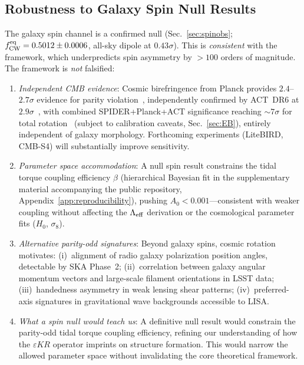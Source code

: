 \documentclass[aps,prd,twocolumn,superscriptaddress,showpacs,preprintnumbers,nofootinbib,longbibliography,floatfix]{revtex4-2}
\newcommand{\Leff}{\Lambda_{\rm eff}}
\newcommand{\fcw}{f_{\rm CW}}
\begin{document}
\subsection{Robustness to Galaxy Spin Null Results}\label{sec:spinnull}

The galaxy spin channel is a confirmed null (Sec.~\ref{sec:spinobs}; $\fcw^{\rm eq} = 0.5012 \pm 0.0006$, all-sky dipole at $0.43\sigma$). This is \textit{consistent} with the framework, which underpredicts spin asymmetry by $>100$ orders of magnitude. The framework is \textit{not} falsified:

\begin{enumerate}[leftmargin=*]
\item \textit{Independent CMB evidence}: Cosmic birefringence from Planck provides $2.4$--$2.7\sigma$ evidence for parity violation~\cite{Minami2020,Eskilt2022}, independently confirmed by ACT~DR6 at $2.9\sigma$~\cite{DiegoPalazuelos2025}, with combined SPIDER+Planck+ACT significance reaching ${\sim}7\sigma$ for total rotation~\cite{SPIDER2025} (subject to calibration caveats, Sec.~\ref{sec:EB}), entirely independent of galaxy morphology. Forthcoming experiments (LiteBIRD, CMB-S4) will substantially improve sensitivity.

\item \textit{Parameter space accommodation}: A null spin result constrains the tidal torque coupling efficiency $\beta$ (hierarchical Bayesian fit in the supplementary material accompanying the public repository, Appendix~\ref{app:reproducibility}), pushing $A_0 < 0.001$---consistent with weaker coupling without affecting the $\Leff$ derivation or the cosmological parameter fits ($H_0$, $\sigma_8$).

\item \textit{Alternative parity-odd signatures}: Beyond galaxy spins, cosmic rotation motivates: (i)~alignment of radio galaxy polarization position angles, detectable by SKA Phase~2; (ii)~correlation between galaxy angular momentum vectors and large-scale filament orientations in LSST data; (iii)~handedness asymmetry in weak lensing shear patterns; (iv)~preferred-axis signatures in gravitational wave backgrounds accessible to LISA.

\item \textit{What a spin null would teach us}: A definitive null result would constrain the parity-odd tidal torque coupling efficiency, refining our understanding of how the $\varepsilon KR$ operator imprints on structure formation. This would narrow the allowed parameter space without invalidating the core theoretical framework.
\end{enumerate}
\end{document}

